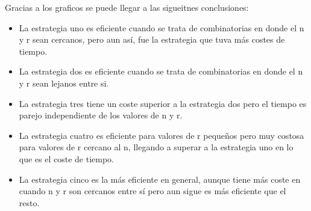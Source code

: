 \documentclass[12pt,letterpaper]{scrartcl}
\begin{document}
Gracias a los graficos se puede llegar a las sigueitnes conclusiones:

\begin{itemize}
\item La estrategia uno es eficiente cuando se trata de combinatorias en donde el n y r sean cercanos, pero aun así, fue la estrategia que tuva más costes de tiempo.
\item La estrategia dos es eficiente cuando se trata de combinatorias en donde el n y r sean lejanos entre si.
\item La estrategia tres tiene un coste superior a la estrategia dos pero el tiempo es parejo independiente de los valores de n y r.
\item La estrategia cuatro es eficiente para valores de r pequeños pero muy costosa para valores de r cercano al n, llegando a superar a la estrategia uno en lo que es el coste de tiempo.
\item La estrategia cinco es la más eficiente en general, aunque tiene más coste en cuando n y r son cercanos entre sí pero aun sigue es más eficiente que el resto.
\end{itemize}
\end{document}
